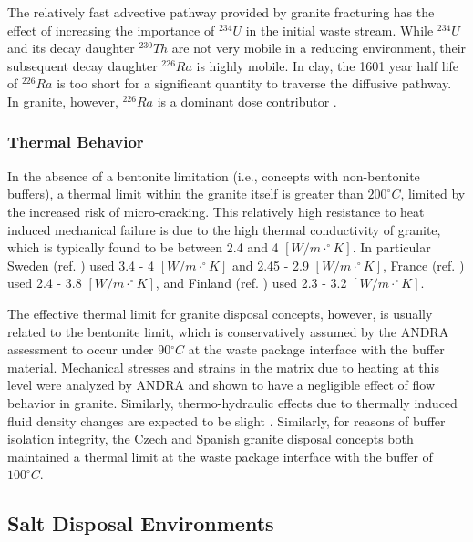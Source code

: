 The relatively fast advective pathway provided by granite fracturing
has the effect of increasing the importance of $^{234}U$ in the initial waste 
stream. While $^{234}U$ and its decay daughter $^{230}Th$ are not very mobile 
in a reducing environment, their subsequent decay daughter $^{226}Ra$ is highly 
mobile. In clay, the 1601 year half life of $^{226}Ra$ is too short for a 
significant quantity to traverse the diffusive pathway. In granite, however,  
$^{226}Ra$ is a dominant dose contributor \cite{swift_applying_2010}. 

\subsubsection{Thermal Behavior}
\label{subsec:granitethermal}
In the absence of a bentonite limitation (i.e., concepts with non-bentonite 
buffers), a thermal limit within the granite itself is greater than 
$200^{\circ}C$, limited by the increased risk of micro-cracking. This 
relatively high resistance to heat  induced mechanical failure is due to the 
high thermal conductivity of granite, which is typically found to be between 
2.4 and 4 $[W/m\cdot^{\circ}K]$.  In particular Sweden (ref. 
\cite{ab_long-term_2006}) used 3.4 - 4 $[W/m\cdot^{\circ}K]$ and 2.45 - 2.9 
$[W/m\cdot^{\circ}K]$,  France (ref.  \cite{andra_argile:_2005}) used 2.4 - 3.8 
$[W/m\cdot^{\circ}K]$, and  Finland (ref. \cite{posiva_interim_2010}) used 2.3 
- 3.2 $[W/m\cdot^{\circ}K]$. 

The effective thermal limit for granite disposal concepts, however, is usually 
related to the bentonite limit, which is conservatively assumed by the \gls{ANDRA} assessment to occur under 
90$^{\circ}C$ at the waste package interface with the buffer material.  
Mechanical stresses and strains in the matrix due to heating at this 
level were analyzed by \gls{ANDRA} and shown to have a negligible effect of 
flow behavior in granite. Similarly, thermo-hydraulic effects due to thermally
induced fluid density changes are expected to be slight 
\cite{andra_granite:_2005}.
Similarly, for reasons of buffer isolation integrity, the Czech and Spanish
granite disposal concepts both maintained a thermal limit at the waste package
interface with the buffer of $100^{\circ}C$.  \cite{von_lensa_red-impact_2008}

\subsection{Salt Disposal Environments}

